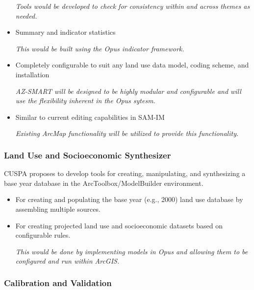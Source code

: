 \begin{itemize}
\emph{Tools would be developed to check for consistency within and across themes as needed.}

\item Summary and indicator statistics

\emph{This would be built using the Opus indicator framework.}

\item Completely configurable to suit any land use data model, coding scheme, and installation

\emph{AZ-SMART will be designed to be highly modular and configurable and will use the flexibility inherent in the Opus sytesm.}

\item Similar to current editing capabilities in SAM-IM

\emph{Existing ArcMap functionality will be utilized to provide this functionality.}

\end{itemize}

\subsubsection{Land Use and Socioeconomic Synthesizer}

CUSPA proposes to develop tools for creating, manipulating, and synthesizing a base year database in the ArcToolbox/ModelBuilder environment.

\begin{itemize}

\item For creating and populating the base year (e.g., 2000) land use database by assembling multiple sources.

\item For creating projected land use and socioeconomic datasets based on configurable rules.

\emph{This would be done by implementing models in Opus and allowing them to be configured and run within ArcGIS. }

\end{itemize}

\subsubsection{Calibration and Validation}

